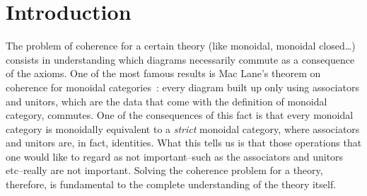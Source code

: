 \section{Introduction}
%

The problem of coherence for a certain theory (like monoidal, monoidal closed\dots) consists in understanding which diagrams necessarily commute as a consequence of the axioms. One of the most famous results is Mac Lane's theorem on coherence for monoidal categories~\cite{mac_lane_natural_1963}: every diagram built up only using associators and unitors, which are the data that come with the definition of monoidal category, commutes. One of the consequences of this fact is that every monoidal category is monoidally equivalent to a \emph{strict} monoidal category, where associators and unitors are, in fact, identities. What this tells us is that those operations that one would like to regard as not important--such as the associators and unitors etc--really are not important. Solving the coherence problem for a theory, therefore, is fundamental to the complete understanding of the theory itself.

